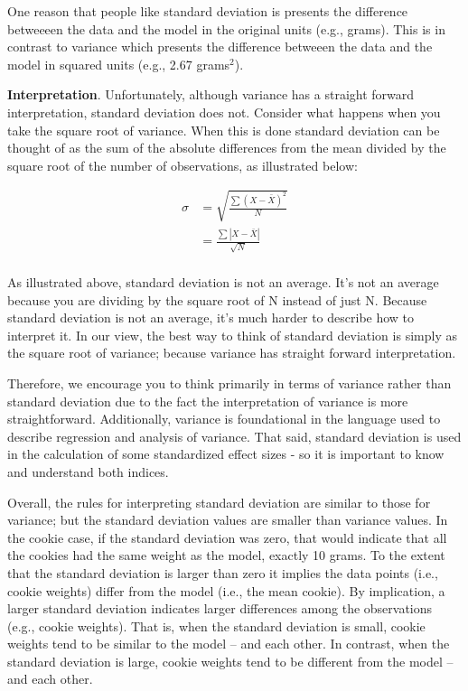 \documentclass[
]{krantz}
\begin{document}
One reason that people like standard deviation is presents the difference betweeeen the data and the model in the original units (e.g., grams). This is in contrast to variance which presents the difference betweeen the data and the model in squared units (e.g., 2.67 grams\(^2\)).

\textbf{Interpretation}. Unfortunately, although variance has a straight forward interpretation, standard deviation does not. Consider what happens when you take the square root of variance. When this is done standard deviation can be thought of as the sum of the absolute differences from the mean divided by the square root of the number of observations, as illustrated below:

\[
\begin{aligned} 
\sigma &= \sqrt{\frac{\sum{(X - \bar{X})^2}}{N}}\\
 &= \frac{\sum{|X - \bar{X}|}}{\sqrt{N}}\\
\end{aligned} 
\]

As illustrated above, standard deviation is not an average. It's not an average because you are dividing by the square root of N instead of just N. Because standard deviation is not an average, it's much harder to describe how to interpret it. In our view, the best way to think of standard deviation is simply as the square root of variance; because variance has straight forward interpretation.

Therefore, we encourage you to think primarily in terms of variance rather than standard deviation due to the fact the interpretation of variance is more straightforward. Additionally, variance is foundational in the language used to describe regression and analysis of variance. That said, standard deviation is used in the calculation of some standardized effect sizes - so it is important to know and understand both indices.

Overall, the rules for interpreting standard deviation are similar to those for variance; but the standard deviation values are smaller than variance values. In the cookie case, if the standard deviation was zero, that would indicate that all the cookies had the same weight as the model, exactly 10 grams. To the extent that the standard deviation is larger than zero it implies the data points (i.e., cookie weights) differ from the model (i.e., the mean cookie). By implication, a larger standard deviation indicates larger differences among the observations (e.g., cookie weights). That is, when the standard deviation is small, cookie weights tend to be similar to the model -- and each other. In contrast, when the standard deviation is large, cookie weights tend to be different from the model -- and each other.
\end{document}
